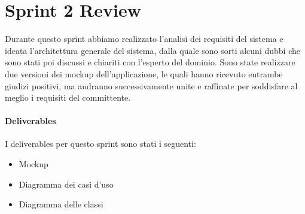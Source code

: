 \section{Sprint 2 Review}
Durante questo sprint abbiamo realizzato l'analisi dei requisiti del sistema e ideata l'architettura generale del sistema, dalla quale sono sorti alcuni dubbi che sono stati poi discussi e chiariti con l'esperto del dominio. Sono state realizzare due versioni dei mockup dell'applicazione, le quali hanno ricevuto entrambe giudizi positivi, ma andranno successivamente unite e raffinate per soddisfare al meglio i requisiti del committente.
\paragraph{Deliverables} 
I deliverables per questo sprint sono stati i seguenti:
\begin{itemize}
    \item Mockup
    \item Diagramma dei casi d'uso
    \item Diagramma delle classi
\end{itemize}
